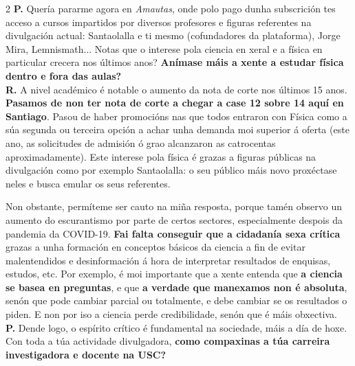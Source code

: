 \begin{refsection}
\begin{multicols}{2}
\noindent \textbf{P.} \hspace{5px} Quería pararme agora en \emph{Amautas}, onde polo pago dunha subscrición tes acceso a cursos impartidos por diversos profesores e figuras referentes na divulgación actual: Santaolalla e ti mesmo (cofundadores da plataforma), Jorge Mira, Lemnismath... Notas que o interese pola ciencia en xeral e a física en particular crecera nos últimos anos? \textbf{Anímase máis a xente a estudar física dentro e fora das aulas?}\\

\noindent \textbf{R.} \hspace{5px} A nivel académico é notable o aumento da nota de corte nos últimos 15 anos. \textbf{Pasamos de non ter nota de corte a chegar a case 12 sobre 14 aquí en Santiago}. Pasou de haber promocións nas que todos entraron con Física como a súa segunda ou terceira opción a achar unha demanda moi superior á oferta (este ano, as solicitudes de admisión ó grao alcanzaron as catrocentas aproximadamente). Este interese pola física é grazas a figuras públicas na divulgación como por exemplo Santaolalla: o seu público máis novo proxéctase neles e busca emular os seus referentes.

Non obstante, permíteme ser cauto na miña resposta, porque tamén observo un aumento do escurantismo por parte de certos sectores, especialmente despois da pandemia da COVID-19. \textbf{Fai falta conseguir que a cidadanía sexa crítica} grazas a unha formación en conceptos básicos da ciencia a fin de evitar malentendidos e desinformación á hora de interpretar resultados de enquisas, estudos, etc. Por exemplo, é moi importante que a xente entenda que \textbf{a ciencia se basea en preguntas}, e que \textbf{a verdade que manexamos non é absoluta}, senón que pode cambiar parcial ou totalmente, e debe cambiar se os resultados o piden. E non por iso a ciencia perde credibilidade, senón que é máis obxectiva.\\

\noindent \textbf{P.} \hspace{5px} Dende logo, o espírito crítico é fundamental na sociedade, máis a día de hoxe. Con toda a túa actividade divulgadora, \textbf{como compaxinas a túa carreira investigadora e docente na USC?}\\


\end{multicols}
\end{refsection}
